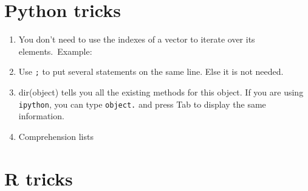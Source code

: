 \documentclass[a4paper,11pt]{article}
\begin{document}
\section{Python tricks}
\begin{enumerate}
\item You don't need to use the indexes of a vector to iterate over its elements.\
Example:
\item Use \texttt{;} to put several statements on the same line. Else it is not needed.
\item dir(object) tells you all the existing methods for this object. If you are using
\texttt{ipython}, you can type \texttt{object.} and press Tab to display the same information.
\item Comprehension lists
\end{enumerate}

\section{R tricks}
\end{document}
